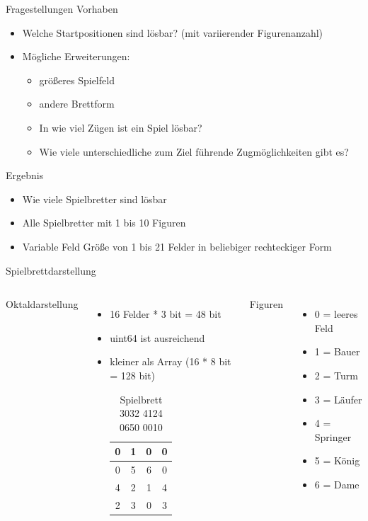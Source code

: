\documentclass{beamer}
\begin{document}
\begin{frame}{Fragestellungen}
Vorhaben
\begin{itemize}

	\item Welche Startpositionen sind lösbar? (mit variierender Figurenanzahl)
	\item Mögliche Erweiterungen: 
	\begin{itemize}
	\item größeres Spielfeld 
	\item andere Brettform
	\item In wie viel Zügen ist ein Spiel lösbar? 
	\item Wie viele unterschiedliche zum Ziel führende Zugmöglichkeiten gibt es?
	\end{itemize}
\end{itemize}

Ergebnis
\begin{itemize}
	\item Wie viele Spielbretter sind lösbar
	\item Alle Spielbretter mit 1 bis 10 Figuren
	\item Variable Feld Größe von 1 bis 21 Felder in beliebiger rechteckiger Form
\end{itemize}
\end{frame}


\begin{frame}{Spielbrettdarstellung}
\begin{columns}
	Oktaldarstellung
	\begin{itemize}
		\item 16 Felder * 3 bit = 48 bit
		\item uint64 ist ausreichend
		\item kleiner als Array (16 * 8 bit = 128 bit)
		
		\begin{table}
			\begin{tabular}{|c|c|c|c|}\hline
			 0 &  1 &  0 &  0 \\ \hline
			 0 &  5 &  6 &  0 \\ \hline
			 4 &  2 &  1 & 4 \\ \hline
			 2 &  3 &  0 &  3 \\ \hline
			\end{tabular}
			\caption{Spielbrett 3032 4124 0650 0010}
			\label{table:Tabelle1}
		\end{table}
	\end{itemize}
	Figuren
	\begin{itemize}
		\item 0 = leeres Feld
		\item 1 = Bauer
		\item 2 = Turm
		\item 3 = Läufer
		\item 4 = Springer
		\item 5 = König
		\item 6 = Dame
	\end{itemize}		
\end{columns}
\end{frame}
\end{document}
